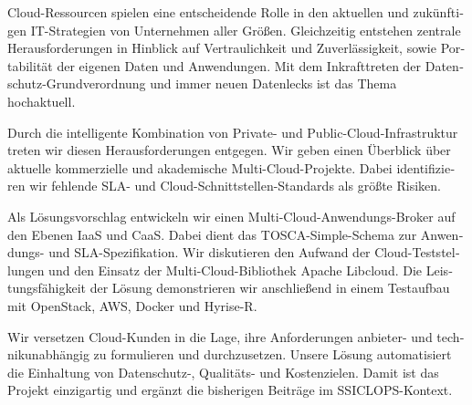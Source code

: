 \null\vfil
\begin{otherlanguage}{ngerman}
\begin{center}\textsf{\textbf{\abstractname}}\end{center}

Cloud-Ressourcen spielen eine entscheidende Rolle in den aktuellen und zukünftigen IT-Strategien von Unternehmen aller Größen. Gleichzeitig entstehen zentrale Herausforderungen in Hinblick auf Vertraulichkeit und Zuverlässigkeit, sowie Portabilität der eigenen Daten und Anwendungen. Mit dem Inkrafttreten der Datenschutz-Grundverordnung und immer neuen Datenlecks ist das Thema hochaktuell.

Durch die intelligente Kombination von Private- und Public-Cloud-Infrastruktur treten wir diesen Herausforderungen entgegen. Wir geben einen Überblick über aktuelle kommerzielle und akademische Multi-Cloud-Projekte. Dabei identifizieren wir fehlende SLA- und Cloud-Schnittstellen-Standards als größte Risiken.

Als Lösungsvorschlag entwickeln wir einen Multi-Cloud-Anwendungs-Broker auf den Ebenen IaaS und CaaS. Dabei dient das TOSCA-Simple-Schema zur Anwendungs- und SLA-Spezi\-fi\-ka\-tion. Wir diskutieren den Aufwand der Cloud-Teststellungen und den Einsatz der Multi-Cloud-Bibliothek Apache Libcloud. Die Leistungsfähigkeit der Lösung demonstrieren wir anschließend in einem Testaufbau mit OpenStack, AWS, Docker und Hyrise-R.

Wir versetzen Cloud-Kunden in die Lage, ihre Anforderungen anbieter- und technikunabhängig zu formulieren und durchzusetzen. Unsere Lösung automatisiert die Einhaltung von Datenschutz-, Qualitäts- und Kostenzielen. Damit ist das Projekt einzigartig und ergänzt die bisherigen Beiträge im SSICLOPS-Kontext.

\end{otherlanguage}
\vfil\null



